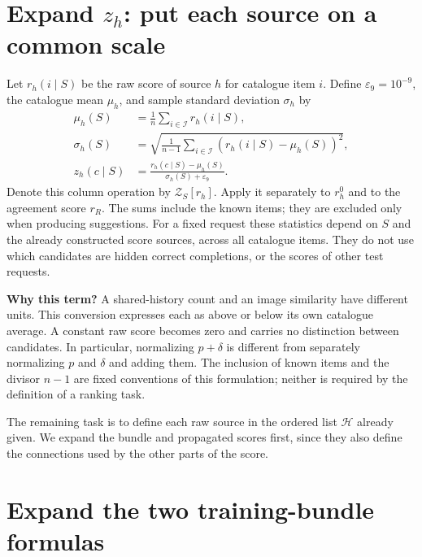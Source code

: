 \documentclass[11pt,a4paper]{article}
\newcommand{\I}{\mathcal I}\newcommand{\pos}[1]{\left[#1\right]_+}
\newcommand{\why}{\par\textbf{Why this term?} }
\numberwithin{equation}{section}
\begin{document}
\section{Expand $z_h$: put each source on a common scale}\label{standard}
Let $r_h(i\mid S)$ be the raw score of source $h$ for catalogue item $i$. Define
$\varepsilon_9=10^{-9}$, the catalogue mean $\mu_h$, and sample standard deviation $\sigma_h$ by
\begin{align}
 \mu_h(S)&=\frac1n\sum_{i\in\I}r_h(i\mid S),\\
 \sigma_h(S)&=\sqrt{\frac1{n-1}\sum_{i\in\I}(r_h(i\mid S)-\mu_h(S))^2},\\
 \boxed{z_h(c\mid S)}&\boxed{=\frac{r_h(c\mid S)-\mu_h(S)}{\sigma_h(S)+\varepsilon_9}.}\label{z}
\end{align}
Denote this column operation by $\mathcal Z_S[r_h]$. Apply it separately to $r_h^0$ and to the agreement score $r_R$.
The sums include the known items; they are excluded only when producing suggestions.
For a fixed request these statistics depend on $S$ and the already constructed
score sources, across all catalogue items. They do not use which candidates are
hidden correct completions, or the scores of other test requests.
\why A shared-history count and an image similarity have different units. This conversion
expresses each as above or below its own catalogue average. A constant raw score becomes
zero and carries no distinction between candidates. In particular, normalizing $p+\delta$
is different from separately normalizing $p$ and $\delta$ and adding them. The inclusion of known items and the divisor $n-1$ are fixed conventions of this formulation; neither is required by the definition of a ranking task.

The remaining task is to define each raw source in the ordered list $\mathcal H$ already given.
We expand the bundle and propagated scores first, since they also define the connections used
by the other parts of the score.

\section{Expand the two training-bundle formulas}\label{bundledefs}
\end{document}
